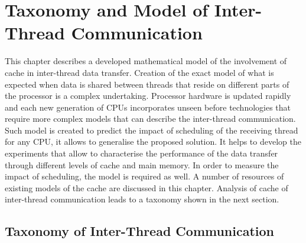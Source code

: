 
\chapter{Taxonomy and Model of Inter-Thread Communication} %
\label{chapterModel}


\ifpdf
    \graphicspath{{X/figures/PNG/}{X/figures/PDF/}{X/figures/}}
\else
    \graphicspath{{X/figures/EPS/}{X/figures/}}
\fi


This chapter describes a developed mathematical model of the involvement of cache in inter-thread data transfer. Creation of the exact model of what is expected when data is shared between threads that reside on different parts of the processor is a complex undertaking. Processor hardware is updated rapidly and each new generation of CPUs incorporates unseen before technologies that require more complex models that can describe the inter-thread communication. Such model is created to predict the impact of scheduling of the receiving thread for any CPU, it allows to generalise the proposed solution. It helps to develop the experiments that allow to characterise the performance of the data transfer through different levels of cache and main memory. In order to measure the impact of scheduling, the model is required as well. A number of resources of existing models of the cache are discussed in this chapter. Analysis of cache of inter-thread communication leads to a taxonomy shown in the next section. 

\section{Taxonomy of Inter-Thread Communication}
\label{taxonomy}

